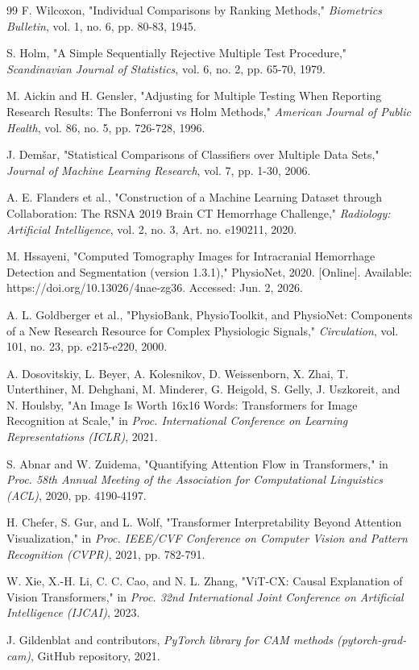 \begin{thebibliography}{99}
 F. Wilcoxon, "Individual Comparisons by Ranking Methods," \emph{Biometrics Bulletin}, vol. 1, no. 6, pp. 80-83, 1945.

 S. Holm, "A Simple Sequentially Rejective Multiple Test Procedure," \emph{Scandinavian Journal of Statistics}, vol. 6, no. 2, pp. 65-70, 1979.

 M. Aickin and H. Gensler, "Adjusting for Multiple Testing When Reporting Research Results: The Bonferroni vs Holm Methods," \emph{American Journal of Public Health}, vol. 86, no. 5, pp. 726-728, 1996.

 J. Demšar, "Statistical Comparisons of Classifiers over Multiple Data Sets," \emph{Journal of Machine Learning Research}, vol. 7, pp. 1-30, 2006.

 A. E. Flanders et al., "Construction of a Machine Learning Dataset through Collaboration: The RSNA 2019 Brain CT Hemorrhage Challenge," \emph{Radiology: Artificial Intelligence}, vol. 2, no. 3, Art. no. e190211, 2020.

 M. Hssayeni, "Computed Tomography Images for Intracranial Hemorrhage Detection and Segmentation (version 1.3.1)," PhysioNet, 2020. [Online]. Available: https://doi.org/10.13026/4nae-zg36. Accessed: Jun. 2, 2026.

 A. L. Goldberger et al., "PhysioBank, PhysioToolkit, and PhysioNet: Components of a New Research Resource for Complex Physiologic Signals," \emph{Circulation}, vol. 101, no. 23, pp. e215-e220, 2000.

 A. Dosovitskiy, L. Beyer, A. Kolesnikov, D. Weissenborn, X. Zhai, T. Unterthiner, M. Dehghani, M. Minderer, G. Heigold, S. Gelly, J. Uszkoreit, and N. Houlsby, "An Image Is Worth 16x16 Words: Transformers for Image Recognition at Scale," in \emph{Proc. International Conference on Learning Representations (ICLR)}, 2021.

 S. Abnar and W. Zuidema, "Quantifying Attention Flow in Transformers," in \emph{Proc. 58th Annual Meeting of the Association for Computational Linguistics (ACL)}, 2020, pp. 4190-4197.

 H. Chefer, S. Gur, and L. Wolf, "Transformer Interpretability Beyond Attention Visualization," in \emph{Proc. IEEE/CVF Conference on Computer Vision and Pattern Recognition (CVPR)}, 2021, pp. 782-791.

 W. Xie, X.-H. Li, C. C. Cao, and N. L. Zhang, "ViT-CX: Causal Explanation of Vision Transformers," in \emph{Proc. 32nd International Joint Conference on Artificial Intelligence (IJCAI)}, 2023.

 J. Gildenblat and contributors, \emph{PyTorch library for CAM methods (pytorch-grad-cam)}, GitHub repository, 2021.
\end{thebibliography}
